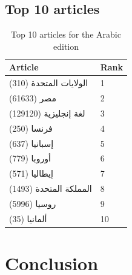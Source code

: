 \subsection{Top 10 articles}
\begin{table}[htbp]
    \begin{minipage}{.30\linewidth}
        \begin{tabular}{ll}
            \toprule
            Article & Rank\\
            \midrule
            الولايات المتحدة (310) & 1\\
            مصر (61633) & 2\\
            لغة إنجليزية (129120) & 3\\
            فرنسا (250) & 4\\
            إسبانيا (637) & 5\\
            أوروبا (779) & 6\\
            إيطاليا (571) & 7\\
            المملكة المتحدة (1493) & 8\\
            روسيا (5996) & 9\\
            ألمانيا (35) & 10\\
            \bottomrule
        \end{tabular}
        \caption{Top 10 articles for the Arabic edition}
    \end{minipage}
\end{table}

\section{Conclusion}
